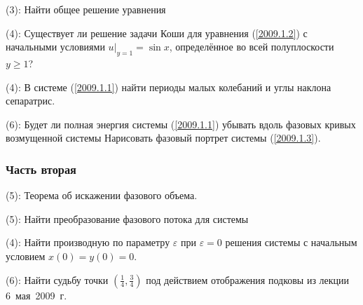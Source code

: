 \documentclass[a4paper]{article}
\newcommand{\skill}[1]{\textsf{(#1):}}
\begin{document}
\begin{problem}
\skill{3} Найти общее решение уравнения 
\end{problem}

\begin{problem}
\skill{4} Существует ли решение задачи Коши для уравнения (\ref{2009.1.2}) с начальными условиями $u\rvert_{y=1} = \sin x$, определённое во всей полуплоскости $y \ge 1$?
\end{problem}

\begin{problem}
\skill{4} В системе (\ref{2009.1.1}) найти периоды малых колебаний и углы наклона сепаратрис.
\end{problem}

\begin{problem}
\skill{6} Будет ли полная энергия системы (\ref{2009.1.1}) убывать вдоль фазовых кривых возмущенной системы
Нарисовать фазовый портрет системы (\ref{2009.1.3}).
\end{problem}

\subsubsection{Часть вторая}

\begin{problem}
\skill{5} Теорема об искажении фазового объема.
\end{problem}

\begin{problem}
\skill{5} Найти преобразование фазового потока для системы 
\end{problem}

\begin{problem}
\skill{4} Найти производную по параметру $\varepsilon$ при $\varepsilon = 0$ решения системы  с начальным условием $x(0) = y(0) = 0$.
\end{problem}

\begin{problem}
\skill{6} Найти судьбу точки $(\frac{1}{4}, \frac{3}{4})$ под действием отображения подковы из лекции 6~мая~2009~г.
\end{problem}
\end{document}
